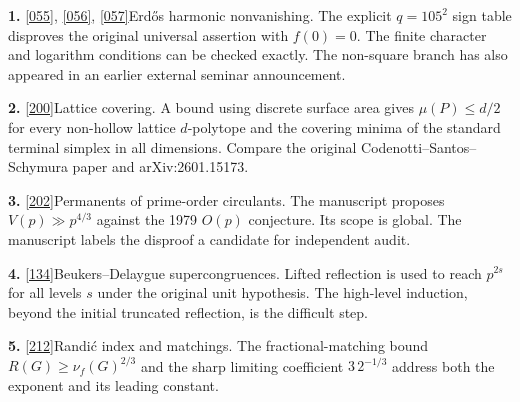 \documentclass[11pt]{article}
\begin{document}
\noindent\textbf{1.} \href{https://github.com/QEEDDD/Verifiable-Mathematical-Reasoning-Corpus/blob/c2ac34ea4622778187173f41bb1996deee8081b7/\%5B055\%5D\%20ERDOS\%20CONJECTURE.tex}{[055]}, \href{https://github.com/QEEDDD/Verifiable-Mathematical-Reasoning-Corpus/blob/c2ac34ea4622778187173f41bb1996deee8081b7/\%5B056\%5D\%20SQUARE\%20MODULI\%2C\%20SPARSE\%20MASKS\%2C\%20AND\%20SIGN\%20OBSTRUCTIONS\%20FOR\%20VANISHING\%20ERDOS\%20SUMS\%20.tex}{[056]}, \href{https://github.com/QEEDDD/Verifiable-Mathematical-Reasoning-Corpus/blob/c2ac34ea4622778187173f41bb1996deee8081b7/\%5B057\%5D\%20erdos_nonsquare_moduli.tex}{[057]}\quad Erd\H{o}s harmonic nonvanishing. The explicit $q=105^2$ sign table disproves the original universal assertion with $f(0)=0$. The finite character and logarithm conditions can be checked exactly. The non-square branch has also appeared in an earlier external seminar announcement.

\noindent\textbf{2.} \href{https://github.com/QEEDDD/Verifiable-Mathematical-Reasoning-Corpus/blob/c2ac34ea4622778187173f41bb1996deee8081b7/\%5B200\%5D\%20lattice_covering_flows.tex}{[200]}\quad Lattice covering. A bound using discrete surface area gives $\mu(P)\le d/2$ for every non-hollow lattice $d$-polytope and the covering minima of the standard terminal simplex in all dimensions. Compare the original Codenotti--Santos--Schymura paper and arXiv:2601.15173.

\noindent\textbf{3.} \href{https://github.com/QEEDDD/Verifiable-Mathematical-Reasoning-Corpus/blob/c2ac34ea4622778187173f41bb1996deee8081b7/\%5B202\%5D\%20Minc27_R10_Nemeth_Seberry_Shu_Disproof.tex}{[202]}\quad Permanents of prime-order circulants. The manuscript proposes $V(p)\gg p^{4/3}$ against the 1979 $O(p)$ conjecture. Its scope is global. The manuscript labels the disproof a candidate for independent audit.

\noindent\textbf{4.} \href{https://github.com/QEEDDD/Verifiable-Mathematical-Reasoning-Corpus/blob/c2ac34ea4622778187173f41bb1996deee8081b7/\%5B134\%5D\%20Beukers55.tex}{[134]}\quad Beukers--Delaygue supercongruences. Lifted reflection is used to reach $p^{2s}$ for all levels $s$ under the original unit hypothesis. The high-level induction, beyond the initial truncated reflection, is the difficult step.

\noindent\textbf{5.} \href{https://github.com/QEEDDD/Verifiable-Mathematical-Reasoning-Corpus/blob/c2ac34ea4622778187173f41bb1996deee8081b7/\%5B212\%5D\%20randic_extremal_matchings.tex}{[212]}\quad Randi\'c index and matchings. The fractional-matching bound $R(G)\ge\nu_f(G)^{2/3}$ and the sharp limiting coefficient $3\,2^{-1/3}$ address both the exponent and its leading constant.
\end{document}
